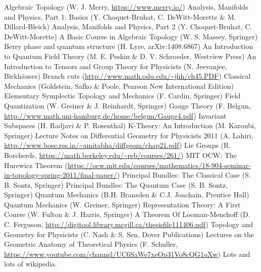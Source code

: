 \documentclass[12pt]{report}
\begin{document}
\begin{thebibliography}{99}
	Algebraic Topology (W. J. Merry, \url{https://www.merry.io/})
	Analysis, Manifolds and Physics, Part 1: Basics (Y. Choquet-Bruhat, C. DeWitt-Morette \& M. Dillard-Bleick)
	Analysis, Manifolds and Physics, Part 2 (Y. Choquet-Bruhat, C. DeWitt-Morette)
	A Basic Course in Algebraic Topology (W. S. Massey, Springer)
	Berry phase and quantum structure (H. Lyre, arXiv:1408.6867)
	An Introduction to Quantum Field Theory (M. E. Peskin \& D. V. Schroeder, Westview Press)
    	An Introduction to Tensors and Group Theory for Physicists (N. Jeevanjee, Birkh\"auser)
    	Branch cuts (\url{http://www.math.odu.edu/~jhh/ch45.PDF})
	Classical Mechanics (Goldstein, Safko \& Poole, Pearson New International Edition)
	Elementary Symplectic Topology and Mechanics (F. Cardin, Springer)
	Field Quantization (W. Greiner \& J. Reinhardt, Springer)
	Gauge Theory (F. Belgun, \url{http://www.math.uni-hamburg.de/home/belgun/Gauge4.pdf})
	Invariant Subspaces (H. Radjavi \& P. Rosenthal)
	K-Theory: An Introduction (M. Karoubi, Springer)
	Lecture Notes on Differential Geometry for Physicists 2011 (A. Lahiri, \url{http://www.bose.res.in/~amitabha/diffgeom/chap21.pdf})
	Lie Groups (R. Borcherds, \url{https://math.berkeley.edu/~reb/courses/261/})
	MIT OCW: The Hurewicz Theorem (\url{https://ocw.mit.edu/courses/mathematics/18-904-seminar-in-topology-spring-2011/final-paper/})
	Principal Bundles: The Classical Case (S. B. Sontz, Springer)
	Principal Bundles: The Quantum Case (S. B. Sontz, Springer)
    	Quantum Mechanics (B.H. Bransden \& C.J. Joachain, Prentice Hall)
    	Quantum Mechanics (W. Greiner, Springer)
	Representation Theory: A First Course (W. Fulton \& J. Harris, Springer)
	A Theorem Of Looman-Menchoff (D. C. Ferguson, \url{http://digitool.library.mcgill.ca/thesisfile111406.pdf})
	Topology and Geometry for Physicists (C. Nash \& S. Sen, Dover Publications)
	Lectures on the Geometric Anatomy of Theoretical Physics (F. Schuller, \url{https://www.youtube.com/channel/UC6SaWe7xeOp31Vo8cQG1oXw})
	Lots and lots of wikipedia.
\end{thebibliography}
\printindex
\end{document}
